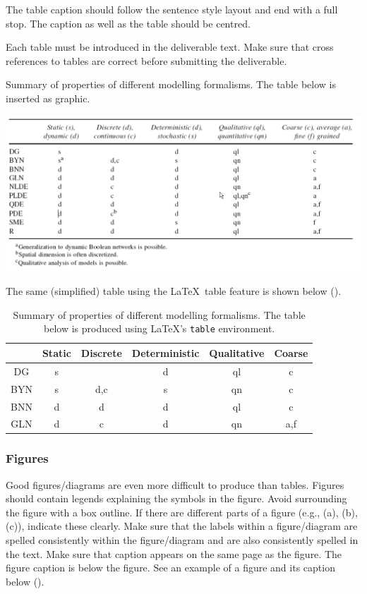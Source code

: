 The table caption should follow the sentence style layout and end with a full stop. The caption as well as the table should be centred.

Each table must be introduced in the deliverable text. Make sure that cross references to tables are correct before submitting the deliverable.

\begin{table}[htb]
	\centering
	\caption{Summary of properties of different modelling formalisms. The table below is inserted as graphic.}
	\label{tab:graphicastable}
	\includegraphics[width=1.00\linewidth]{graphics/graphicastable}  
\end{table}

The same (simplified) table using the \LaTeX\ table feature is shown below ().

\begin{table}[htb]
	\centering
	\caption{Summary of properties of different modelling formalisms. The table below is produced using \LaTeX's {\tt table} environment.}
	\label{tab:latextable}
	\begin{tabular}{cccccc}
		\hline
		& Static & Discrete & Deterministic & Qualitative & Coarse \\
	    \hline
	    DG & s &  & d & ql & c \\
	    BYN & s & d,c & s & qn & c\\
	    BNN & d & d & d & ql & c\\
	    GLN & d & c & d & qn & a,f\\
		\hline
	\end{tabular}
\end{table}

\subsubsection{Figures}

Good figures/diagrams are even more difficult to produce than tables. Figures should contain legends explaining the symbols in the figure. Avoid surrounding the figure with a box outline. If there are different parts of a figure (e.g., (a), (b), (c)), indicate these clearly. Make sure that the labels within a figure/diagram are spelled consistently within the figure/diagram and are also consistently spelled in the text. Make sure that caption appears on the same page as the figure. The figure caption is below the figure. See an example of a figure and its caption below ().

